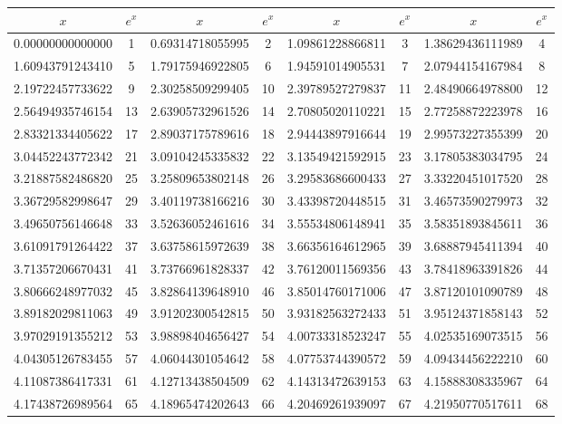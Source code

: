 \documentclass{exam}
\begin{document}
\begin{figure}
\centering
\begin{tabular}{|c|c||c|c||c|c||c|c|}
\hline
$x$ & $e^x$ & $x$ & $e^x$ & $x$ & $e^x$ & $x$ & $e^x$ \\
\hline
\hline
0.00000000000000 & 1 &0.69314718055995 & 2 &1.09861228866811 & 3 &1.38629436111989 & 4 \\
\hline
1.60943791243410 & 5 &1.79175946922805 & 6 &1.94591014905531 & 7 &2.07944154167984 & 8 \\
\hline
2.19722457733622 & 9 &2.30258509299405 & 10 &2.39789527279837 & 11 &2.48490664978800 & 12 \\
\hline
2.56494935746154 & 13 &2.63905732961526 & 14 &2.70805020110221 & 15 &2.77258872223978 & 16 \\
\hline
2.83321334405622 & 17 &2.89037175789616 & 18 &2.94443897916644 & 19 &2.99573227355399 & 20 \\
\hline
3.04452243772342 & 21 &3.09104245335832 & 22 &3.13549421592915 & 23 &3.17805383034795 & 24 \\
\hline
3.21887582486820 & 25 &3.25809653802148 & 26 &3.29583686600433 & 27 &3.33220451017520 & 28 \\
\hline
3.36729582998647 & 29 &3.40119738166216 & 30 &3.43398720448515 & 31 &3.46573590279973 & 32 \\
\hline
3.49650756146648 & 33 &3.52636052461616 & 34 &3.55534806148941 & 35 &3.58351893845611 & 36 \\
\hline
3.61091791264422 & 37 &3.63758615972639 & 38 &3.66356164612965 & 39 &3.68887945411394 & 40 \\
\hline
3.71357206670431 & 41 &3.73766961828337 & 42 &3.76120011569356 & 43 &3.78418963391826 & 44 \\
\hline
3.80666248977032 & 45 &3.82864139648910 & 46 &3.85014760171006 & 47 &3.87120101090789 & 48 \\
\hline
3.89182029811063 & 49 &3.91202300542815 & 50 &3.93182563272433 & 51 &3.95124371858143 & 52 \\
\hline
3.97029191355212 & 53 &3.98898404656427 & 54 &4.00733318523247 & 55 &4.02535169073515 & 56 \\
\hline
4.04305126783455 & 57 &4.06044301054642 & 58 &4.07753744390572 & 59 &4.09434456222210 & 60 \\
\hline
4.11087386417331 & 61 &4.12713438504509 & 62 &4.14313472639153 & 63 &4.15888308335967 & 64 \\
\hline
4.17438726989564 & 65 &4.18965474202643 & 66 &4.20469261939097 & 67 &4.21950770517611 & 68 \\

\end{tabular}
\end{figure}
\end{document}
